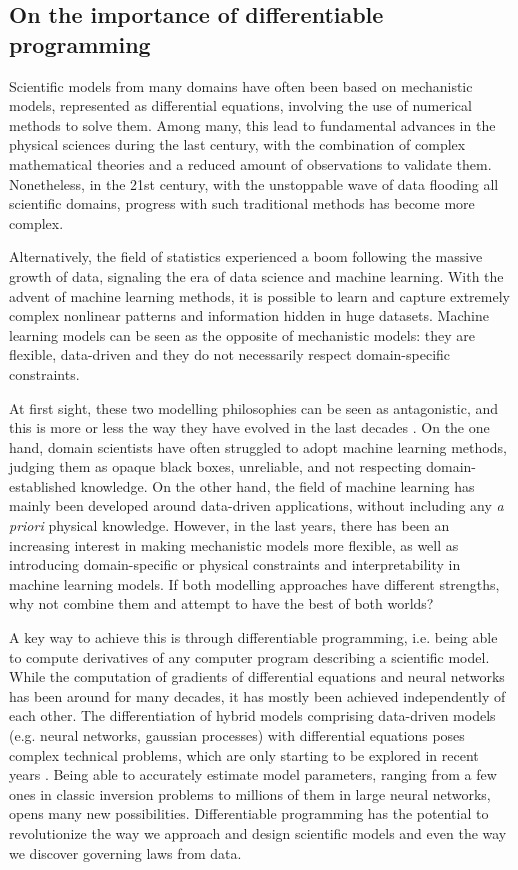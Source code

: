 \subsection{On the importance of differentiable programming}

Scientific models from many domains have often been based on mechanistic models, represented as differential equations, involving the use of numerical methods to solve them. 
Among many, this lead to fundamental advances in the physical sciences during the last century, with the combination of complex mathematical theories and a reduced amount of observations to validate them. 
Nonetheless, in the 21st century, with the unstoppable wave of data flooding all scientific domains, progress with such traditional methods has become more complex. 

Alternatively, the field of statistics experienced a boom following the massive growth of data, signaling the era of data science and machine learning.
With the advent of machine learning methods, it is possible to learn and capture extremely complex nonlinear patterns and information hidden in huge datasets. 
Machine learning models can be seen as the opposite of mechanistic models: they are flexible, data-driven and they do not necessarily respect domain-specific constraints.

At first sight, these two modelling philosophies can be seen as antagonistic, and this is more or less the way they have evolved in the last decades \cite{zdeborova_understanding_2020}. 
On the one hand, domain scientists have often struggled to adopt machine learning methods, judging them as opaque black boxes, unreliable, and not respecting domain-established knowledge. 
On the other hand, the field of machine learning has mainly been developed around data-driven applications, without including any \textit{a priori} physical knowledge. 
However, in the last years, there has been an increasing interest in making mechanistic models more flexible, as well as introducing domain-specific or physical constraints and interpretability in machine learning models. 
If both modelling approaches have different strengths, why not combine them and attempt to have the best of both worlds?

A key way to achieve this is through differentiable programming, i.e. being able to compute derivatives of any computer program describing a scientific model.
While the computation of gradients of differential equations and neural networks has been around for many decades, it has mostly been achieved independently of each other. 
The differentiation of hybrid models comprising data-driven models (e.g. neural networks, gaussian processes) with differential equations poses complex technical problems, which are only starting to be explored in recent years \cite{ma_comparison_2021}. 
Being able to accurately estimate model parameters, ranging from a few ones in classic inversion problems to millions of them in large neural networks, opens many new possibilities. 
Differentiable programming has the potential to revolutionize the way we approach and design scientific models and even the way we discover governing laws from data. 

